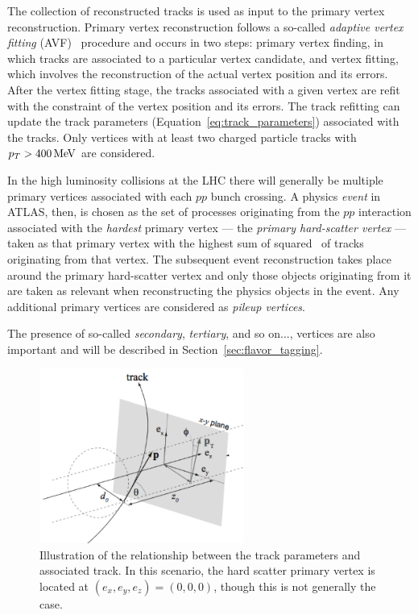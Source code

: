 The collection of reconstructed tracks is used as input to the primary vertex reconstruction.
Primary vertex reconstruction follows a so-called \textit{adaptive vertex fitting} (AVF)~\cite{Aaboud:2016rmg,Piacquadio_2008}
procedure and occurs in two steps: primary vertex finding,
in which tracks are associated to a particular vertex candidate, and vertex fitting,
which involves the reconstruction of the actual vertex position and its errors.
After the vertex fitting stage, the tracks associated with a given vertex are refit
with the constraint of the vertex position and its errors. The track refitting can update
the track parameters (Equation~\ref{eq:track_parameters}) associated with the tracks.
Only vertices with at least two charged particle tracks with $p_{T} > 400\,\text{Me\kern -0.1em V}$ are
considered.

In the high luminosity collisions at the LHC there will generally be multiple primary vertices
associated with each $pp$ bunch crossing.
A physics \textit{event} in ATLAS, then, is chosen as the set of processes originating from the $pp$ interaction
associated with the \textit{hardest} primary vertex --- the \textit{primary hard-scatter vertex} --- taken as that primary vertex with the
highest sum of squared \pT~of tracks originating from that vertex.
The subsequent event reconstruction takes place around the primary hard-scatter vertex and only
those objects originating from it are taken as relevant when reconstructing the physics objects in the event.
Any additional primary vertices are considered as \textit{pileup vertices}.

The presence of so-called \textit{secondary}, \textit{tertiary}, and so on..., vertices are also
important and will be described in Section~\ref{sec:flavor_tagging}.

\begin{figure}[!htb]
    \begin{center}
        \includegraphics[width=0.6\textwidth]{figures/chapter3/perigee_params}
        \caption{
            Illustration of the relationship between the track parameters and associated track.
            In this scenario, the hard scatter primary vertex is located
            at $(e_x, e_y, e_z) = (0,0,0)$, though this is not generally the case.
        }
        \label{fig:track_params}
    \end{center}
\end{figure}

